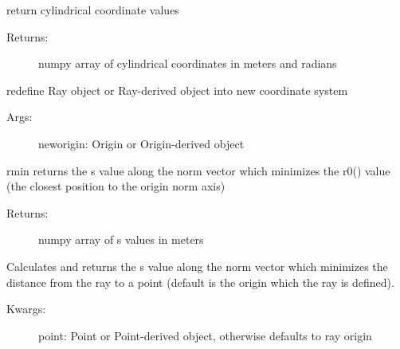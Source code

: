 \documentclass[letterpaper,10pt,english]{sphinxmanual}
\begin{document}
\begin{fulllineitems}
\begin{description}
\end{description}

\begin{fulllineitems}
\label{TRIPPy:TRIPPy.beam.Ray.r}
return cylindrical coordinate values
\begin{description}
\item[{Returns:}] \leavevmode
numpy array of cylindrical coordinates in meters and radians

\end{description}

\end{fulllineitems}


\begin{fulllineitems}
\label{TRIPPy:TRIPPy.beam.Ray.redefine}
redefine Ray object or Ray-derived object
into new coordinate system
\begin{description}
\item[{Args:}] \leavevmode
neworigin: Origin or Origin-derived object

\end{description}

\end{fulllineitems}


\begin{fulllineitems}
\label{TRIPPy:TRIPPy.beam.Ray.rmin}
rmin returns the s value along the norm vector which minimizes
the r0() value (the closest position to the origin norm axis)
\begin{description}
\item[{Returns:}] \leavevmode
numpy array of s values in meters

\end{description}

\end{fulllineitems}


\begin{fulllineitems}
\label{TRIPPy:TRIPPy.beam.Ray.smin}
Calculates and returns the s value along the norm vector
which minimizes the distance from the ray to a point 
(default is the origin which the ray is defined).
\begin{description}
\item[{Kwargs:}] \leavevmode
point: Point or Point-derived object, otherwise defaults to ray 
origin


\end{description}
\end{fulllineitems}
\end{fulllineitems}
\end{document}

